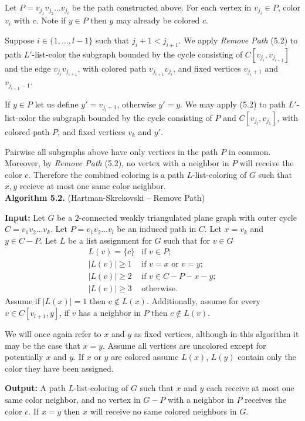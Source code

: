 \documentclass[letterpaper, 12pt]{article}
\theoremstyle{definition}
\theoremstyle{definition}
\theoremstyle{thm}
\theoremstyle{definition}
\begin{document}
Let $P=v_{j_1}v_{j_2}\ldots v_{j_l}$ be the path constructed above.
For each vertex in $v_{j_i}\in P$, color $v_i$ with $c$.
Note if $y\in P$ then $y$ may already be colored $c$.

Suppose
$i\in\{1,\ldots,l-1\}$ such that $j_i+1<j_{i+1}$. We apply \textit{Remove Path}
(5.2) to path $L'$-list-color the subgraph bounded by the cycle consisting of
$C[v_{j_i},v_{j_{i+1}}]$ and the edge $v_{j_i}v_{j_{i+1}}$, with colored path
$v_{j_{i+1}}v_{j_i}$, and fixed vertices $v_{j_i+1}$ and $v_{j_{i+1}-1}$.

If $y\in P$ let us define $y'=v_{j_l+1}$, otherwise $y'=y$.
We may apply  (5.2) to path $L'$-list-color the
subgraph bounded by the cycle consisting of $P$ and $C[v_{j_l},v_{j_1}]$, with
colored path $P$, and fixed vertices $v_k$ and $y'$.

Pairwise all subgraphs above have only vertices in the path $P$ in common.
Moreover, by \textit{Remove Path} (5.2), no vertex with a neighbor in $P$ will
receive the color $c$. Therefore the combined coloring is a path
$L$-list-coloring of $G$ such that $x,y$ recieve at most one same color
neighbor.\\

\noindent\textbf{Algorithm 5.2.} (Hartman-Skrekovski -- Remove Path)

\noindent\textbf{Input:} Let $G$ be a $2$-connected weakly triangulated plane
graph with outer cycle $C=v_1v_2\ldots v_k$. Let $P=v_1v_2\ldots v_l$ be an
induced path in $C$. Let $x=v_k$ and $y\in C-P$. Let $L$ be a list
assignment for $G$ such that for $v\in G$
\[
    \begin{array}{ll}
        L(v)=\{c\} & \text{if } v\in P;\\
	    |L(v)|\ge 1 & \text{if } v=x \text{ or } v=y;\\
	    |L(v)|\ge 2 & \text{if } v\in C-P-x-y;\\
	    |L(v)|\ge 3 & \text{otherwise.}
    \end{array}
\]
Assume if $|L(x)|=1$ then $c\not\in L(x)$. Additionally, assume for every
$v\in C[v_{l+1},y]$, if $v$ has a neighbor in $P$ then $c\not\in L(v)$.

We will once again refer to $x$ and $y$ as fixed vertices, although in this
algorithm it may be the case that $x=y$. Assume all
vertices are uncolored except for potentially $x$ and $y$. If $x$ or $y$ are
colored assume $L(x)$, $L(y)$ contain only the color they have been assigned.

\noindent\textbf{Output:} A path $L$-list-coloring of $G$ such that $x$ and
$y$ each receive at most one same color neighbor, and no vertex in
$G-P$ with a neighbor in $P$ receives the color $c$. If $x=y$ then $x$ will
receive no same colored neighbors in $G$.
\end{document}

